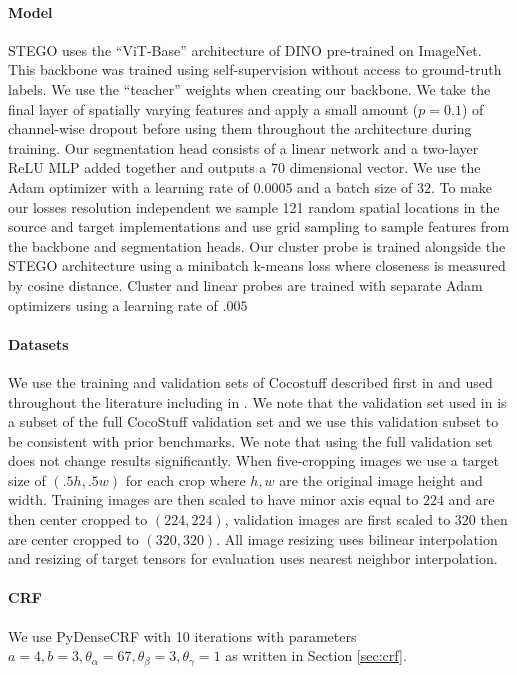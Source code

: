 \documentclass{article} \usepackage{iclr2022_conference,times}
\begin{document}
\paragraph{Model} STEGO uses the ``ViT-Base'' architecture of DINO pre-trained on ImageNet. This backbone was trained using self-supervision without access to ground-truth labels. We use the ``teacher'' weights when creating our backbone. We take the final layer of spatially varying features and apply a small amount ($p=0.1$) of channel-wise dropout \citep{dropout} before using them throughout the architecture during training. Our segmentation head consists of a linear network and a two-layer ReLU MLP added together and outputs a $70$ dimensional vector. We use the Adam optimizer \citep{adam} with a learning rate of $0.0005$ and a batch size of $32$. To make our losses resolution independent we sample 121 random spatial locations in the source and target implementations and use grid sampling \citep{stn} to sample features from the backbone and segmentation heads. Our cluster probe is trained alongside the STEGO architecture using a minibatch k-means loss where closeness is measured by cosine distance. Cluster and linear probes are trained with separate Adam optimizers using a learning rate of $.005$

\paragraph{Datasets} We use the training and validation sets of Cocostuff described first in \cite{iic} and used throughout the literature including in \cite{Cho2021PiCIEUS}. We note that the validation set used in \cite{iic} is a subset of the full CocoStuff validation set and we use this validation subset to be consistent with prior benchmarks. We note that using the full validation set does not change results significantly. When five-cropping images we use a target size of $(.5h,.5w)$ for each crop where $h,w$ are the original image height and width. Training images are then scaled to have minor axis equal to $224$ and are then center cropped to $(224,224)$, validation images are first scaled to $320$ then are center cropped to $(320,320)$. All image resizing uses bilinear interpolation and resizing of target tensors for evaluation uses nearest neighbor interpolation.

\paragraph{CRF} We use PyDenseCRF \citep{fullcrf} with 10 iterations with parameters $a=4, b=3, \theta_\alpha=67, \theta_\beta=3, \theta_\gamma=1$ as written in Section \ref{sec:crf}.
\end{document}
